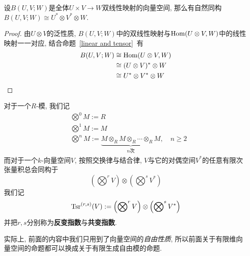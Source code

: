 \begin{prop}\label{bilinear and tensor}
    设$B(U,V;W)$是全体$U\times V\to W$双线性映射的向量空间, 那么有自然同构$B(U,V;W)\cong U^*\otimes V^*\otimes W$.
\end{prop}
\begin{proof}
    由$U\otimes V$的泛性质, $B(U,V;W)$中的双线性映射与$\operatorname{Hom}(U\otimes V,W)$中的线性映射一一对应, 结合命题~\ref{linear and tensor}~有
    \begin{align*}
        B(U,V;W)&\cong\operatorname{Hom}(U\otimes V,W)\\
        &\cong (U\otimes V)^*\otimes W\\
        &\cong U^*\otimes V^*\otimes W\qedhere
    \end{align*}
\end{proof}

\begin{sym}
    对于一个$R$-模, 我们记
    \begin{align*}
        &\bigotimes\nolimits^0 M:=R\\
        &\bigotimes\nolimits^1 M:=M\\
        &\bigotimes\nolimits^n M:=\underbrace{M\otimes_R M\otimes_R\cdots\otimes_R M}_{n\text{次}},\quad n\geq 2
    \end{align*}
    而对于一个$k$-向量空间$V$, 按照交换律与结合律, $V$与它的对偶空间$V^*$的任意有限次张量积总会同构于
    \[\left(\bigotimes\nolimits^r V\right)\otimes\left(\bigotimes\nolimits^s V^*\right)\]
    我们记
    \[\operatorname{Tsr}^{(r,s)}(V):=\left(\bigotimes\nolimits^r V\right)\otimes\left(\bigotimes\nolimits^s V^*\right)\]
    并把$r,s$分别称为\textbf{反变指数}与\textbf{共变指数}.
\end{sym}

实际上, 前面的内容中我们只用到了向量空间的\textit{自由性质}, 所以前面关于有限维向量空间的命题都可以换成关于有限生成自由模的命题.

